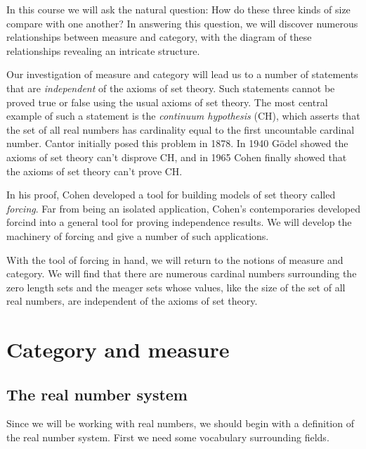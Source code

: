 \documentclass[11pt,oneside]{amsbook}
\theoremstyle{definition}
\theoremstyle{plain}
\theoremstyle{definition}
\theoremstyle{remark}
\numberwithin{equation}{section}
\numberwithin{figure}{section}
\begin{document}
In this course we will ask the natural question: How do these three kinds of size compare with one another? In answering this question, we will discover numerous relationships between measure and category, with the diagram of these relationships revealing an intricate structure.

Our investigation of measure and category will lead us to a number of statements that are \emph{independent} of the axioms of set theory. Such statements cannot be proved true or false using the usual axioms of set theory. The most central example of such a statement is the \emph{continuum hypothesis} (CH), which asserts that the set of all real numbers has cardinality equal to the first uncountable cardinal number. Cantor initially posed this problem in 1878. In 1940 G\"odel showed the axioms of set theory can't disprove CH, and in 1965 Cohen finally showed that the axioms of set theory can't prove CH.

In his proof, Cohen developed a tool for building models of set theory called \emph{forcing}. Far from being an isolated application, Cohen's contemporaries developed forcind into a general tool for proving independence results. We will develop the machinery of forcing and give a number of such applications.

With the tool of forcing in hand, we will return to the notions of measure and category. We will find that there are numerous cardinal numbers surrounding the zero length sets and the meager sets whose values, like the size of the set of all real numbers, are independent of the axioms of set theory.


\chapter{Category and measure}

\section{The real number system}

Since we will be working with real numbers, we should begin with a definition of the real number system. First we need some vocabulary surrounding fields.
\end{document}
